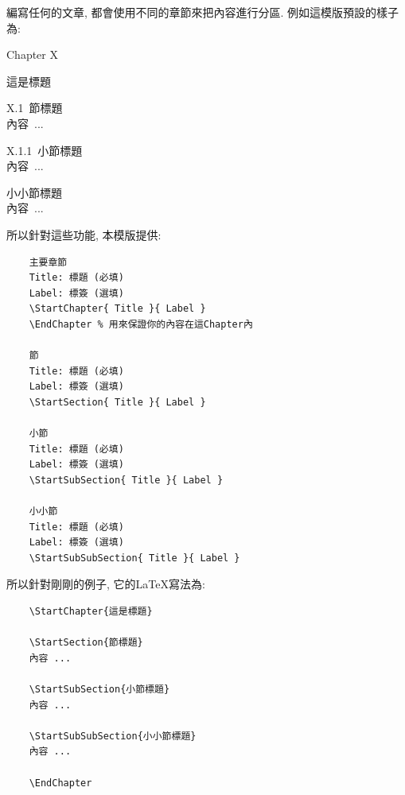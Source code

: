 
編寫任何的文章, 都會使用不同的章節來把內容進行分區. 例如這模版預設的樣子為:
\begin{DescriptionFrame}
  \vspace{0.2cm}
  \centerline{\LARGE Chapter X}
  \vspace{0.3cm}
  \centerline{\LARGE 這是標題}

  \vspace{0.5cm}
  \mbox{\Large X.1 節標題}\\
  \mbox{\hspace{1.2cm}內容 ...}

  \vspace{0.3cm}
  \mbox{\large X.1.1 小節標題}\\
  \mbox{\hspace{1.2cm}內容 ...}

  \vspace{0.3cm}
  \mbox{\large 小小節標題}\\
  \mbox{\hspace{1.2cm}內容 ...}
\end{DescriptionFrame}

所以針對這些功能, 本模版提供:
\begin{DescriptionFrame}
  \begin{verbatim}
    主要章節
    Title: 標題 (必填)
    Label: 標簽 (選填)
    \StartChapter{ Title }{ Label }
    \EndChapter % 用來保證你的內容在這Chapter內

    節
    Title: 標題 (必填)
    Label: 標簽 (選填)
    \StartSection{ Title }{ Label }

    小節
    Title: 標題 (必填)
    Label: 標簽 (選填)
    \StartSubSection{ Title }{ Label }

    小小節
    Title: 標題 (必填)
    Label: 標簽 (選填)
    \StartSubSubSection{ Title }{ Label }
  \end{verbatim}
\end{DescriptionFrame}

所以針對剛剛的例子, 它的LaTeX寫法為:\\

\begin{DescriptionFrame}
  \begin{verbatim}
    \StartChapter{這是標題}

    \StartSection{節標題}
    內容 ...

    \StartSubSection{小節標題}
    內容 ...

    \StartSubSubSection{小小節標題}
    內容 ...

    \EndChapter
  \end{verbatim}
\end{DescriptionFrame}
